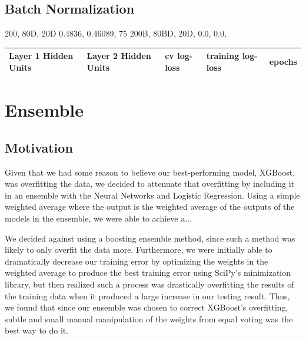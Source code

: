 \documentclass[twoside,11pt]{article}
\theoremstyle{definition}
\begin{document}
\subsection{Batch Normalization}

200, 80D, 20D 0.4836, 0.46089, 75
200B, 80BD, 20D, 0.0, 0.0, 

      \begin{center}
          \begin{tabular}{ | l | l | l | l | p{5cm} |}
          \hline
          Layer 1 Hidden Units & Layer 2 Hidden Units & cv log-loss & training log-loss & epochs \\ \hline
          \end{tabular}
      \end{center}

\section{Ensemble}
  \subsection{Motivation}
  Given that we had some reason to believe our best-performing model, XGBoost, was overfitting the data, we decided to attenuate that overfitting by including it in an ensemble with the Neural Networks and Logistic Regression. Using a simple weighted average where the output is the weighted average of the outputs of the models in the ensemble, we were able to achieve a...

  We decided against using a boosting ensemble method, since such a method was likely to only overfit the data more. Furthermore, we were initially able to dramatically decrease our training error by optimizing the weights in the weighted average to produce the best training error using SciPy's minimization library, but then realized such a process was drastically overfitting the results of the training data when it produced a large increase in our testing result. Thus, we found that since our ensemble was chosen to correct XGBoost's overfitting, subtle and small manual manipulation of the weights from equal voting was the best way to do it.
\end{document}
